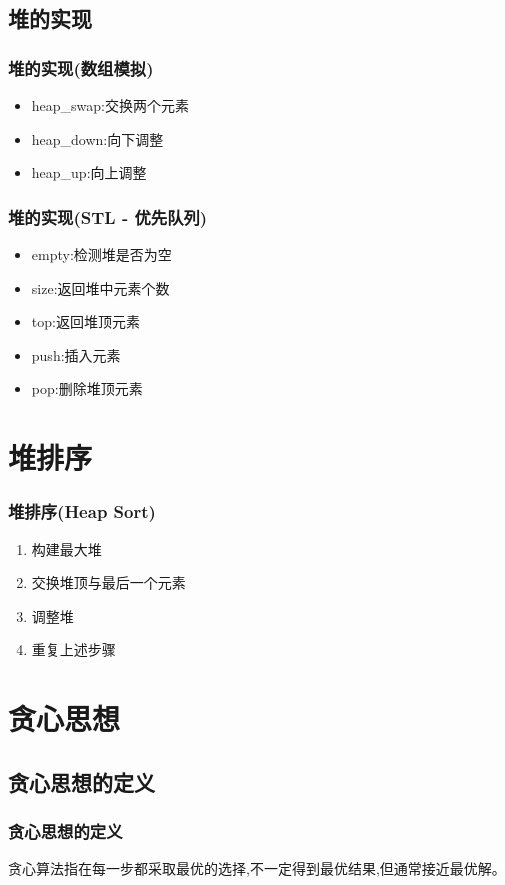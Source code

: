 \documentclass{beamer}
\begin{document}
\subsection{堆的实现}
\begin{frame}
\frametitle{堆的实现(数组模拟)}
\begin{itemize}
    \item heap\_swap:交换两个元素
    \item heap\_down:向下调整
    \item heap\_up:向上调整
\end{itemize}
\end{frame}

\begin{frame}
\frametitle{堆的实现(STL - 优先队列)}
\begin{itemize}
    \item empty:检测堆是否为空
    \item size:返回堆中元素个数
    \item top:返回堆顶元素
    \item push:插入元素
    \item pop:删除堆顶元素
\end{itemize}
\end{frame}

\section{堆排序}
\begin{frame}
\frametitle{堆排序(Heap Sort)}
\begin{enumerate}
    \item 构建最大堆
    \item 交换堆顶与最后一个元素
    \item 调整堆
    \item 重复上述步骤
\end{enumerate}
\end{frame}

\section{贪心思想}
\frame{\sectionpage}
\subsection{贪心思想的定义}
\begin{frame}
\frametitle{贪心思想的定义}
贪心算法指在每一步都采取最优的选择,不一定得到最优结果,但通常接近最优解。
\end{frame}
\end{document}

